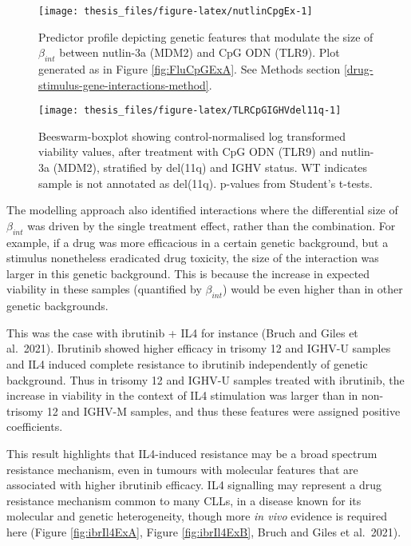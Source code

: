 \documentclass[11pt, a4paper, twosided]{book}
\begin{document}
\begin{figure}

{\centering \texttt{[image: thesis\_files/figure-latex/nutlinCpgEx-1]} 

}

\caption{Predictor profile depicting genetic features that modulate the size of \(\beta_{int}\) between nutlin-3a (MDM2) and CpG ODN (TLR9). Plot generated as in Figure \ref{fig:FluCpGExA}. See Methods section \ref{drug-stimulus-gene-interactions-method}.}\label{fig:nutlinCpgEx}
\end{figure}

\begin{figure}

{\centering \texttt{[image: thesis\_files/figure-latex/TLRCpGIGHVdel11q-1]} 

}

\caption{Beeswarm-boxplot showing control-normalised log transformed viability values, after treatment with CpG ODN (TLR9) and nutlin-3a (MDM2), stratified by del(11q) and IGHV status. WT indicates sample is not annotated as del(11q). p-values from Student's t-tests.}\label{fig:TLRCpGIGHVdel11q}
\end{figure}
The modelling approach also identified interactions where the differential size of \(\beta_{int}\) was driven by the single treatment effect, rather than the combination. For example, if a drug was more efficacious in a certain genetic background, but a stimulus nonetheless eradicated drug toxicity, the size of the interaction was larger in this genetic background. This is because the increase in expected viability in these samples (quantified by \(\beta_{int}\)) would be even higher than in other genetic backgrounds.

This was the case with ibrutinib + IL4 for instance (Bruch and Giles et al.~2021). Ibrutinib showed higher efficacy in trisomy 12 and IGHV-U samples and IL4 induced complete resistance to ibrutinib independently of genetic background. Thus in trisomy 12 and IGHV-U samples treated with ibrutinib, the increase in viability in the context of IL4 stimulation was larger than in non-trisomy 12 and IGHV-M samples, and thus these features were assigned positive coefficients.

This result highlights that IL4-induced resistance may be a broad spectrum resistance mechanism, even in tumours with molecular features that are associated with higher ibrutinib efficacy. IL4 signalling may represent a drug resistance mechanism common to many CLLs, in a disease known for its molecular and genetic heterogeneity, though more \emph{in vivo} evidence is required here (Figure \ref{fig:ibrIl4ExA}, Figure \ref{fig:ibrIl4ExB}, Bruch and Giles et al.~2021).
\end{document}
